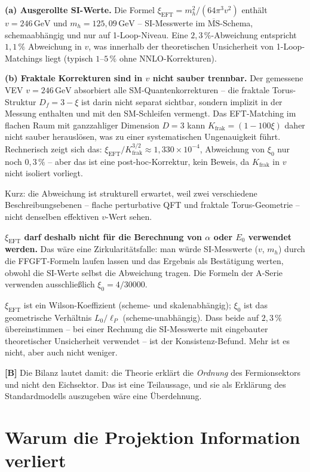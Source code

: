 \textbf{(a) Ausgerollte SI-Werte.} Die Formel $\xi_\text{EFT}=m_h^2/(64\pi^3 v^2)$
enthält $v=246\,\text{GeV}$ und $m_h=125{,}09\,\text{GeV}$ -- SI-Messwerte
im $\overline{\text{MS}}$-Schema, schemaabhängig und nur auf 1-Loop-Niveau.
Eine $2{,}3\,\%$-Abweichung entspricht $1{,}1\,\%$ Abweichung in $v$, was
innerhalb der theoretischen Unsicherheit von 1-Loop-Matchings liegt (typisch
$1$--$5\,\%$ ohne NNLO-Korrekturen).

\textbf{(b) Fraktale Korrekturen sind in $v$ nicht sauber trennbar.}
Der gemessene VEV $v=246\,\text{GeV}$ absorbiert alle SM-Quantenkorrekturen --
die fraktale Torus-Struktur $D_f=3-\xi$ ist darin nicht separat sichtbar,
sondern implizit in der Messung enthalten und mit den SM-Schleifen
vermengt. Das EFT-Matching im flachen Raum mit ganzzahliger Dimension $D=3$
kann $K_\text{frak}=(1-100\xi)$ daher nicht sauber herauslösen, was zu
einer systematischen Ungenauigkeit führt. Rechnerisch zeigt sich das:
$\xi_\text{EFT}/K_\text{frak}^{3/2}\approx1{,}330\times10^{-4}$, Abweichung
von $\xi_0$ nur noch $0{,}3\,\%$ -- aber das ist eine post-hoc-Korrektur,
kein Beweis, da $K_\text{frak}$ in $v$ nicht isoliert vorliegt.

Kurz: die Abweichung ist strukturell erwartet, weil zwei verschiedene
Beschreibungsebenen -- flache perturbative QFT und fraktale Torus-Geometrie
-- nicht denselben effektiven $v$-Wert sehen.

\textbf{$\xi_\text{EFT}$ darf deshalb nicht für die Berechnung von $\alpha$
oder $E_0$ verwendet werden.} Das wäre eine Zirkularitätsfalle: man würde
SI-Messwerte ($v$, $m_h$) durch die FFGFT-Formeln laufen lassen und das
Ergebnis als Bestätigung werten, obwohl die SI-Werte selbst die Abweichung
tragen. Die Formeln der A-Serie verwenden ausschließlich $\xi_0=4/30000$.

$\xi_\text{EFT}$ ist ein Wilson-Koeffizient (scheme- und skalenabhängig);
$\xi_0$ ist das geometrische Verhältnis $L_0/\ell_P$ (scheme-unabhängig).
Dass beide auf $2{,}3\,\%$ übereinstimmen -- bei einer Rechnung die
SI-Messwerte mit eingebauter theoretischer Unsicherheit verwendet --
ist der Konsistenz-Befund. Mehr ist es nicht, aber auch nicht weniger.

\textbf{[B]} Die Bilanz lautet damit: die Theorie erklärt die \emph{Ordnung} des
Fermionsektors und nicht den Eichsektor. Das ist eine Teilaussage, und sie als
Erklärung des Standardmodells auszugeben wäre eine Überdehnung.

\section{Warum die Projektion Information verliert}

